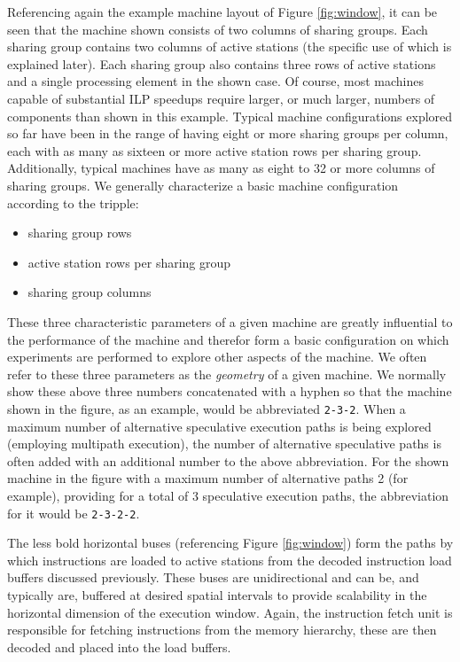 \documentclass[10pt,dvips]{article}
\begin{document}
Referencing again the example machine layout
of Figure \ref{fig:window}, it can be seen that the machine
shown consists of 
two columns of sharing groups.  
Each sharing group contains two columns of
active stations (the specific use of which is explained later).
Each sharing group also contains three rows of active stations
and a single processing element in the shown case.  
Of course, most machines capable of substantial ILP
speedups require larger, or much larger, numbers of
components than shown in this example.
Typical machine configurations explored so far have been in the
range of having eight or more sharing groups per column, each
with as many as sixteen or more active station rows per sharing
group.  Additionally, typical machines have as many as eight to
32 or more columns of sharing groups.
We generally characterize
a basic machine configuration according to the tripple: 
%
\begin{itemize}
\item{sharing group rows}
\item{active station rows per sharing group}
\item{sharing group columns}
\end{itemize}   
%
These three characteristic parameters of a given machine
are greatly influential to the performance of the machine
and therefor form a basic configuration on which experiments
are performed to explore other aspects of the machine.
We often refer to these three parameters as the \textit{geometry} 
of a given machine.
We normally
show these above three numbers concatenated with 
a hyphen so that the machine shown
in the figure, as an example, would be abbreviated {\tt 2-3-2}.
When a maximum number of alternative speculative execution
paths is being explored (employing multipath execution), 
the number of alternative speculative paths is often added
with an additional number to the above abbreviation.
For the shown machine in the figure with a maximum number 
of alternative paths 2 (for example), providing for a total
of 3 speculative execution paths, the abbreviation for it 
would be {\tt 2-3-2-2}.

The less bold horizontal buses (referencing Figure \ref{fig:window})
form the paths by which instructions are loaded to active stations
from the decoded instruction load buffers discussed previously.
These buses are unidirectional and can be, and typically are,
buffered at desired spatial intervals to provide 
scalability in the horizontal dimension
of the execution window.
Again, the instruction fetch unit is responsible for
fetching instructions from the memory hierarchy, these are then decoded
and placed into the load buffers.   
\end{document}
